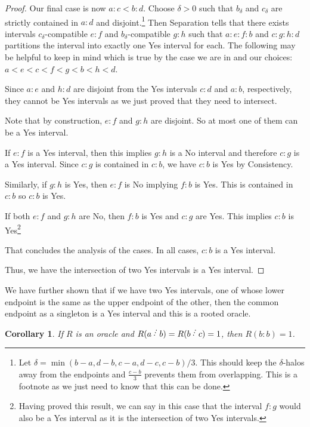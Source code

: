 \documentclass[12pt]{article}
\newtheorem{corollary}{Corollary}[subsection]
\begin{document}
\begin{proof}
Our final case is now $a:c\lt b :d$. Choose $\delta > 0$ such that $b_\delta$ and $c_\delta$ are strictly contained in $a:d$ and disjoint.\footnote{Let $\delta = \min(b-a, d-b, c-a, d-c, c-b)/3$. This should keep the $\delta$-halos away from the endpoints and $\frac{c-b}{3}$ prevents them from overlapping. This is a footnote as we just need to know that this can be done.} Then Separation tells that there exists intervals $c_\delta$-compatible $e:f$ and $b_\delta$-compatible $g:h$ such that $a:e:f:b$ and $c:g:h:d$ partitions the interval into exactly one Yes interval for each. The following may be helpful to keep in mind which is true by the case we are in and our choices: $a < e < c < f< g < b < h < d$.

Since $a:e$ and $h:d$ are disjoint from the Yes intervals $c:d$ and $a:b$, respectively, they cannot be Yes intervals as we just proved that they need to intersect. 

Note that by construction, $e:f$ and $g:h$ are disjoint. So at most one of them can be a Yes interval. 

If $e:f$ is a Yes interval, then this implies $g:h$ is a No interval and therefore $c:g$ is a Yes interval. Since $c:g$ is contained in $c:b$, we have $c:b$ is Yes by Consistency. 

Similarly, if $g:h$ is Yes, then $e:f$ is No implying $f:b$ is Yes. This is contained in $c:b$ so $c:b$ is Yes. 

If both $e:f$ and $g:h$ are No, then $f:b$ is Yes and $c:g$ are Yes. This implies $c:b$ is Yes\footnote{Having proved this result, we can say in this case that the interval $f:g$ would also be a Yes interval as it is the intersection of two Yes intervals.} 

That concludes the analysis of the cases. In all cases, $c:b$ is a Yes interval. 

Thus, we have the intersection of two Yes intervals is a Yes interval. 

\end{proof}

We have further shown that if we have two Yes intervals, one of whose lower endpoint is the same as the upper endpoint of the other, then the common endpoint as a singleton is a Yes interval and this is a rooted oracle. 

\begin{corollary}\label{cor:kissing}
    If $R$ is an oracle and $R(a\lte b)=R(b \lte c) = 1$, then $R(b:b)=1$. 
\end{corollary}
\end{document}
